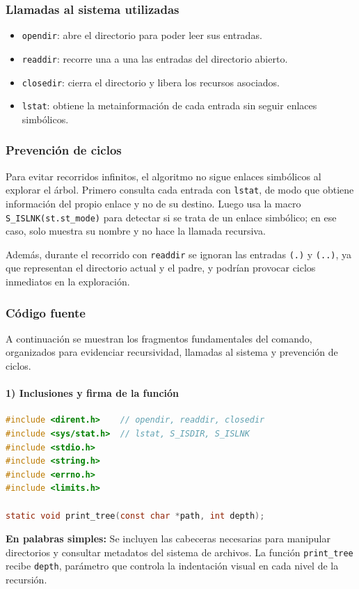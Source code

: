 \documentclass[12pt,spanish]{article}
\begin{document}
\subsubsection*{Llamadas al sistema utilizadas}

\begin{itemize}
    \item \texttt{opendir}: abre el directorio para poder leer sus entradas.
    \item \texttt{readdir}: recorre una a una las entradas del directorio abierto.
    \item \texttt{closedir}: cierra el directorio y libera los recursos asociados.
    \item \texttt{lstat}: obtiene la metainformación de cada entrada sin seguir enlaces simbólicos.
\end{itemize}

\subsubsection*{Prevención de ciclos}

Para evitar recorridos infinitos, el algoritmo no sigue enlaces simbólicos al explorar el árbol. Primero consulta cada entrada con \texttt{lstat}, de modo que obtiene información del propio enlace y no de su destino. Luego usa la macro \texttt{S\_ISLNK(st.st\_mode)} para detectar si se trata de un enlace simbólico; en ese caso, solo muestra su nombre y no hace la llamada recursiva.

Además, durante el recorrido con \texttt{readdir} se ignoran las entradas \texttt{(.)} y \texttt{(..)}, ya que representan el directorio actual y el padre, y podrían provocar ciclos inmediatos en la exploración.

\subsubsection*{Código fuente}
\noindent A continuación se muestran los fragmentos fundamentales del comando, organizados para evidenciar recursividad, llamadas al sistema y prevención de ciclos.

\paragraph{1) Inclusiones y firma de la función}
\begin{lstlisting}[language=C, caption={Cabeceras y prototipo de \texttt{print\_tree}}]
#include <dirent.h>    // opendir, readdir, closedir
#include <sys/stat.h>  // lstat, S_ISDIR, S_ISLNK
#include <stdio.h>
#include <string.h>
#include <errno.h>
#include <limits.h>

static void print_tree(const char *path, int depth);
\end{lstlisting}
\textbf{En palabras simples:} Se incluyen las cabeceras necesarias para manipular directorios y consultar metadatos del sistema de archivos. La función \texttt{print\_tree} recibe \texttt{depth}, parámetro que controla la indentación visual en cada nivel de la recursión.
\end{document}

